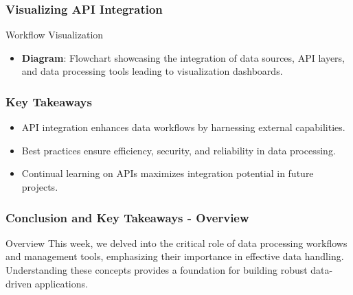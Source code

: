 \documentclass[aspectratio=169]{beamer}
\begin{document}
\begin{frame}[fragile]
    \frametitle{Visualizing API Integration}
    \begin{block}{Workflow Visualization}
        \begin{itemize}
            \item \textbf{Diagram}: Flowchart showcasing the integration of data sources, API layers, and data processing tools leading to visualization dashboards.
        \end{itemize}
    \end{block}
\end{frame}

\begin{frame}[fragile]
    \frametitle{Key Takeaways}
    \begin{itemize}
        \item API integration enhances data workflows by harnessing external capabilities.
        \item Best practices ensure efficiency, security, and reliability in data processing.
        \item Continual learning on APIs maximizes integration potential in future projects.
    \end{itemize}
\end{frame}

\begin{frame}[fragile]
    \frametitle{Conclusion and Key Takeaways - Overview}
    \begin{block}{Overview}
        This week, we delved into the critical role of data processing workflows and management tools, emphasizing their importance in effective data handling. Understanding these concepts provides a foundation for building robust data-driven applications.
    \end{block}
\end{frame}
\end{document}
